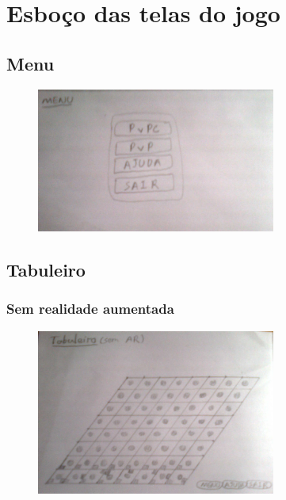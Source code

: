 \documentclass[a4paper,12pt]{book}
\begin{document}
\section{Esbo\c co das telas do jogo}
\label{sec: telas}

\subsection{Menu}
\label{subsec: menu}

\begin{figure}[h]
\centering
\includegraphics[width=0.7\textwidth]{menu}
\end{figure}

\subsection{Tabuleiro}
\label{subsec: tabuleiro}

\subsubsection{Sem realidade aumentada}
\label{subsubsec: semrealidadeaumentada}

\begin{figure}[h]
\centering
\includegraphics[width=0.7\textwidth]{tabuleirosemar}
\end{figure}
\end{document}
